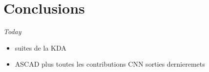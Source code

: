 
\section*{Conclusions}

\begin{frame}
\begin{block}{\textit{Today}}
\begin{itemize}
\item suites de la KDA
\item ASCAD plus toutes les contributions CNN sorties dernieremets
\end{itemize}
\end{block}
\end{frame}
%
%
